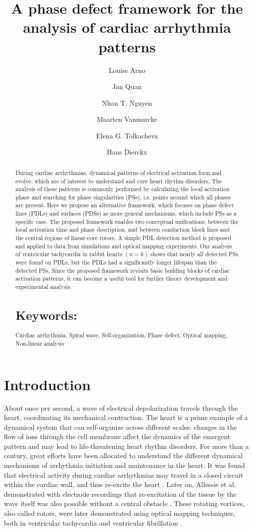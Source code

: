 \documentclass{article}
\date{}
\title{A phase defect framework for the analysis of cardiac arrhythmia patterns}
\author[1]{Louise Arno}
\affil{ KULeuven Campus KULAK, Department of Mathematics, Kortrijk, Belgium }
\author[1]{Jan Quan}
\author[1]{Nhan T. Nguyen}
\author[1]{Maarten Vanmarcke}
\author[2]{Elena G. Tolkacheva}
\affil{ University of Minnesota, Biomedical Engineering Department, Minneapolis, MN 55455, Minnesota, USA}
\author[1]{Hans Dierckx}
\begin{document}
\maketitle


\begin{abstract}
During cardiac arrhythmias, dynamical patterns of electrical activation form and evolve, which are of interest to understand and cure heart rhythm disorders. The analysis of these patterns is commonly performed by calculating the local activation phase and searching for phase singularities (PSs), i.e. points around which all phases are present. 
Here we propose an alternative framework, which focuses on phase defect lines (PDLs) and surfaces (PDSs) as more general mechanisms, which include PSs as a specific case. The proposed framework enables two conceptual unifications: between the local activation time and phase description, and between conduction block lines and the central regions of linear-core rotors. A simple PDL detection method is proposed and applied to data from simulations and optical mapping experiments. Our analysis of ventricular tachycardia in rabbit hearts $(n=6)$ shows that nearly all detected PSs were found on PDLs, but the PDLs had a significantly longer lifespan than the detected PSs. Since the proposed framework revisits basic building blocks of cardiac activation patterns, it can become a useful tool for further theory development and experimental analysis.


 \section{Keywords:} Cardiac arrhythmia, Spiral wave, Self-organization, Phase defect, Optical mapping, Non-linear analysis
\end{abstract}

\section{Introduction}\label{sec:intro}

About once per second, a wave of electrical depolarization travels through the heart, coordinating its mechanical contraction. The heart is a prime example of a dynamical system that can self-organize across different scales: changes in the flow of ions through the cell membrane affect the dynamics of the emergent pattern and may lead to life-threatening heart rhythm disorders. For more than a century, great efforts have been allocated to understand the different dynamical mechanisms of arrhythmia initiation and maintenance in the heart. It was found that electrical activity during cardiac arrhythmias may travel in a closed circuit within the cardiac wall, and thus re-excite the heart \citep{Mines:1913}. Later on, Allessie et al. demonstrated with electrode recordings that re-excitation of the tissue by the wave itself was also possible without a central obstacle \cite{Allessie:1973}. These rotating vortices, also called rotors, were later demonstrated using optical mapping techniques, both in ventricular tachycardia \cite{Gray:1995b} and ventricular fibrillation \cite{Gray:1998}. 
\end{document}
